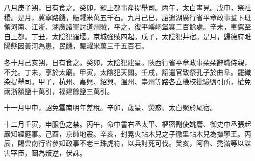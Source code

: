 \begin{pinyinscope}
 八月庚子朔，日有食之。癸卯，罷上都事產提舉司。丙午，太白晝見。戊申，祭社稷。是月，冀寧路饑，賑糶米萬五千石。九月己巳，詔遣湖廣行省平章政事鞏卜班領河南、江浙、湖廣諸軍討道州賊，平之，復平嵠峒堡寨二百餘處。辛未，車駕至自上都。丁丑，太陰犯羅堰。京城強賊四起。戊子，太陰犯井宿。是月，歸德府睢陽縣因黃河為患，民饑，賑糶米萬三千五百石。



 冬十月己亥朔，日有食之。癸卯，太陰犯建星。陜西行省平章政事朵朵辭職侍親，不允。丁未，享於太廟。甲寅，太陰犯天關。壬戌，詔遣官致祭孔子於曲阜。罷織染提舉司。甲子，杭州、嘉興、紹興、溫州、臺州等路各立檢校批驗鹽引所，權免兩浙額鹽十萬引，福建餘鹽三萬引。



 十一月甲申，詔免雲南明年差稅。辛卯，歲星、熒惑、太白聚於尾宿。



 十二月壬寅，申服色之禁。丙午，命中書右丞太平、樞密副使姚庸、御史中丞張起巖知經筵事。己酉，京師地震。辛亥，封晃火帖木兒之子徹里帖木兒為撫寧王。丙辰，賜雲南行省參知政事不老三珠虎符，以兵討死可伐。癸亥，阿魯、禿滿等以謀害宰臣，圖為叛逆，伏誅。



\end{pinyinscope}